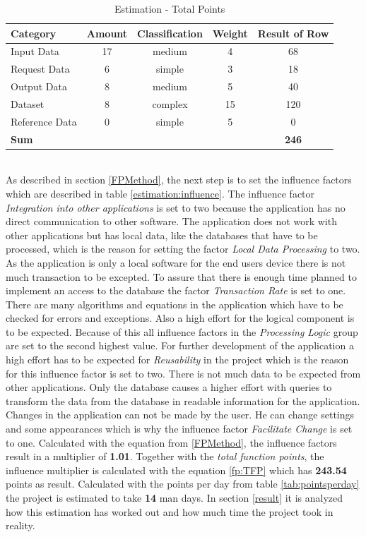 \begin{table}[h]
	\centering 
	\setlength{\tabcolsep}{4pt}
	\begin{tabular}{|l|c|c|c|c|}\hline
		Category		&  Amount 		&  Classification	&  Weight 	& Result of Row\\ \hline
		Input Data   	& 17      		& medium  			& 4			& 68	\\ \hline
		Request Data   	& 6      		& simple  			& 3			& 18	\\ \hline
		Output Data   	& 8      		& medium  			& 5			& 40	\\ \hline
		Dataset   		& 8      		& complex  			& 15		& 120	\\ \hline
		Reference Data  & 0      		& simple  			& 5			& 0	\\ \hline
		\textbf{Sum}   			&       		&   				& 			& \textbf{246}	\\ \hline
	\end{tabular} 
	\caption{Estimation - Total Points} 
	\label{estimation:data} 
\end{table}\\
As described in section \ref{FPMethod}, the next step is to set the influence factors which are described in table \ref{estimation:influence}. The influence factor \textit{Integration into other applications} is set to two because the application has no direct communication to other software. The application does not work with other applications but has local data, like the databases that have to be processed, which is the reason for setting the factor \textit{Local Data Processing} to two. As the application is only a local software for the end users device there is not much transaction to be excepted. To assure that there is enough time planned to implement an access to the database the factor \textit{Transaction Rate} is set to one. There are many algorithms and equations in the application which have to be checked for errors and exceptions. Also a high effort for the logical component is to be expected. Because of this all influence factors in the \textit{Processing Logic} group are set to the second highest value. For further development of the application a high effort has to be expected for \textit{Reusability} in the project which is the reason for this influence factor is set to two. There is not much data to be expected from other applications. Only the database causes a higher effort with queries to transform the data from the database in readable information for the application. Changes in the application can not be made by the user. He can change settings and some appearances which is why the influence factor \textit{Facilitate Change} is set to one. Calculated with the equation from \ref{FPMethod}, the influence factors result in a multiplier of \textbf{1.01}. Together with the \textit{total function points}, the influence multiplier is calculated with the equation \ref{fp:TFP} which has \textbf{243.54} points as result. Calculated with the points per day from table \ref{tab:pointsperday} the project is estimated to take \textbf{14} man days. In section \ref{result} it is analyzed how this estimation has worked out and how much time the project took in reality.\\
